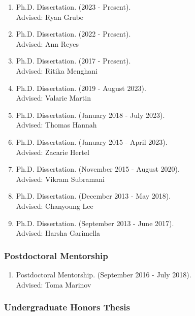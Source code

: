 \documentclass[
]{article}
\begin{document}
\begin{enumerate}
\def\labelenumi{\arabic{enumi}.}
\item
  Ph.D. Dissertation. (2023 - Present).\\
  Advised: Ryan Grube
\item
  Ph.D. Dissertation. (2022 - Present).\\
  Advised: Ann Reyes
\item
  Ph.D. Dissertation. (2017 - Present).\\
  Advised: Ritika Menghani
\item
  Ph.D. Dissertation. (2019 - August 2023).\\
  Advised: Valarie Martin
\item
  Ph.D. Dissertation. (January 2018 - July 2023).\\
  Advised: Thomas Hannah
\item
  Ph.D. Dissertation. (January 2015 - April 2023).\\
  Advised: Zacarie Hertel
\item
  Ph.D. Dissertation. (November 2015 - August 2020).\\
  Advised: Vikram Subramani
\item
  Ph.D. Dissertation. (December 2013 - May 2018).\\
  Advised: Chanyoung Lee
\item
  Ph.D. Dissertation. (September 2013 - June 2017).\\
  Advised: Harsha Garimella
\end{enumerate}

\subsubsection{Postdoctoral Mentorship}\label{postdoctoral-mentorship}

\begin{enumerate}
\def\labelenumi{\arabic{enumi}.}
\item
  Postdoctoral Mentorship. (September 2016 - July 2018).\\
  Advised: Toma Marinov
\end{enumerate}

\subsubsection{Undergraduate Honors
Thesis}\label{undergraduate-honors-thesis}
\end{document}
